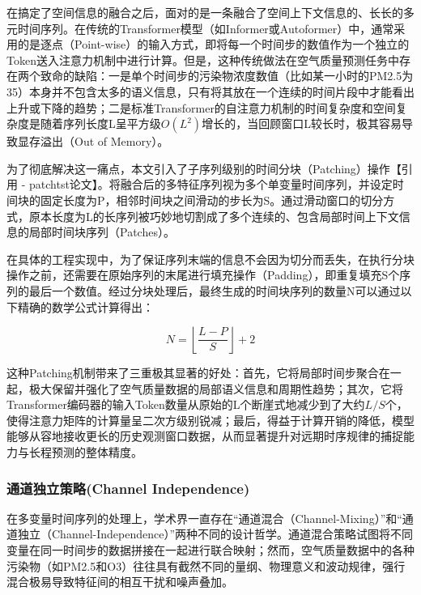 
在搞定了空间信息的融合之后，面对的是一条融合了空间上下文信息的、长长的多元时间序列。在传统的Transformer模型（如Informer或Autoformer）中，通常采用的是逐点（Point-wise）的输入方式，即将每一个时间步的数值作为一个独立的Token送入注意力机制中进行计算。但是，这种传统做法在空气质量预测任务中存在两个致命的缺陷：一是单个时间步的污染物浓度数值（比如某一小时的PM2.5为35）本身并不包含太多的语义信息，只有将其放在一个连续的时间片段中才能看出上升或下降的趋势；二是标准Transformer的自注意力机制的时间复杂度和空间复杂度是随着序列长度L呈平方级$O(L^2)$增长的，当回顾窗口L较长时，极其容易导致显存溢出（Out of Memory）。

为了彻底解决这一痛点，本文引入了子序列级别的时间分块（Patching）操作\cite{[2]}【引用 - patchtst论文】。将融合后的多特征序列视为多个单变量时间序列，并设定时间块的固定长度为P，相邻时间块之间滑动的步长为S。通过滑动窗口的切分方式，原本长度为L的长序列被巧妙地切割成了多个连续的、包含局部时间上下文信息的局部时间块序列（Patches）。

在具体的工程实现中，为了保证序列末端的信息不会因为切分而丢失，在执行分块操作之前，还需要在原始序列的末尾进行填充操作（Padding），即重复填充S个序列的最后一个数值。经过分块处理后，最终生成的时间块序列的数量N可以通过以下精确的数学公式计算得出：

\begin{equation}\label{eq:patch_num}
N = \left\lfloor \frac{L - P}{S} \right\rfloor + 2
\end{equation}

这种Patching机制带来了三重极其显著的好处：首先，它将局部时间步聚合在一起，极大保留并强化了空气质量数据的局部语义信息和周期性趋势；其次，它将Transformer编码器的输入Token数量从原始的L个断崖式地减少到了大约$L/S$个，使得注意力矩阵的计算量呈二次方级别锐减；最后，得益于计算开销的降低，模型能够从容地接收更长的历史观测窗口数据，从而显著提升对远期时序规律的捕捉能力与长程预测的整体精度。

\subsubsection{通道独立策略(Channel Independence)}


在多变量时间序列的处理上，学术界一直存在“通道混合（Channel-Mixing）”和“通道独立（Channel-Independence）”两种不同的设计哲学。通道混合策略试图将不同变量在同一时间步的数据拼接在一起进行联合映射；然而，空气质量数据中的各种污染物（如PM2.5和O3）往往具有截然不同的量纲、物理意义和波动规律，强行混合极易导致特征间的相互干扰和噪声叠加。


